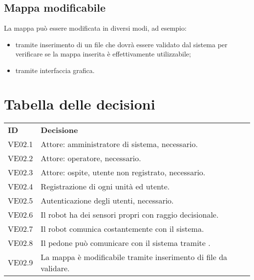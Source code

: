 \documentclass[]{article}
\begin{document}
		\subsection{Mappa modificabile}
		La mappa può essere modificata in diversi modi, ad esempio:
		\begin{itemize}
			\item tramite inserimento di un file che dovrà essere validato dal sistema per verificare se la mappa inserita è effettivamente utilizzabile;
			\item tramite interfaccia grafica.
		\end{itemize}
	
	\newpage
	
	\section{Tabella delle decisioni}

\begin{table} [h!]
	\begin{center}
		\begin{tabular} { m{2cm} m{14cm} }
			\rowcolor{lightgray}
			\textbf{ID} & \textbf{Decisione}\\
			VE02.1 & Attore: amministratore di sistema, necessario.\\
			VE02.2 & Attore: operatore, necessario. \\
			VE02.3 & Attore: ospite, utente non registrato, necessario. \\
			VE02.4 & Registrazione di ogni unità ed utente. \\
			VE02.5 & Autenticazione degli utenti, necessario. \\
			VE02.6 & Il robot ha dei sensori propri con raggio decisionale. \\
			VE02.7 & Il robot comunica costantemente con il sistema.\\
			VE02.8 & Il pedone può comunicare con il sistema tramite \glock{Bluetooth}.\\
			VE02.9 & La mappa è modificabile tramite inserimento di file da validare.
		\end{tabular}
	\end{center}
\end{table}
\end{document}
